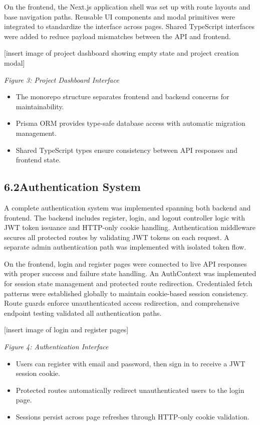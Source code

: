 \documentclass[12pt,a4paper]{article}
\begin{document}
On the frontend, the Next.js application shell was set up with route layouts and base navigation paths. Reusable UI components and modal primitives were integrated to standardize the interface across pages. Shared TypeScript interfaces were added to reduce payload mismatches between the API and frontend.

[insert image of project dashboard showing empty state and project creation modal]

\textit{Figure 3: Project Dashboard Interface}

\begin{itemize}
    \item The monorepo structure separates frontend and backend concerns for maintainability.
    \item Prisma ORM provides type-safe database access with automatic migration management.
    \item Shared TypeScript types ensure consistency between API responses and frontend state.
\end{itemize}

\subsection{6.2\quad Authentication System}

A complete authentication system was implemented spanning both backend and frontend. The backend includes register, login, and logout controller logic with JWT token issuance and HTTP-only cookie handling. Authentication middleware secures all protected routes by validating JWT tokens on each request. A separate admin authentication path was implemented with isolated token flow.

On the frontend, login and register pages were connected to live API responses with proper success and failure state handling. An AuthContext was implemented for session state management and protected route redirection. Credentialed fetch patterns were established globally to maintain cookie-based session consistency. Route guards enforce unauthenticated access redirection, and comprehensive endpoint testing validated all authentication paths.

[insert image of login and register pages]

\textit{Figure 4: Authentication Interface}

\begin{itemize}
    \item Users can register with email and password, then sign in to receive a JWT session cookie.
    \item Protected routes automatically redirect unauthenticated users to the login page.
    \item Sessions persist across page refreshes through HTTP-only cookie validation.
\end{itemize}
\end{document}
